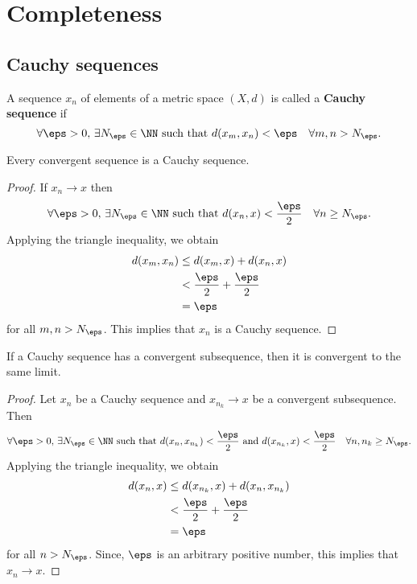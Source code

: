 \documentclass[12pt, a4paper]{article}
\begin{document}
\section{Completeness}

\subsection{Cauchy sequences}

\begin{definition}
    A sequence \(x_n\) of elements of a metric space \((X,d)\) is called a \textbf{Cauchy sequence} if 
    \[\forall \eps>0, \, \exists N_{\eps} \in \NN \text{ such that } d(x_m,x_n) <\eps \quad \forall m,n>N_{\eps}.\]
\end{definition}

\begin{lemma}
    Every convergent sequence is a Cauchy sequence.
\end{lemma}

\begin{proof}
    If \(x_n \to x\) then 
    \[\forall \eps >0, \, \exists N_{\eps} \in \NN \text{ such that } d(x_n,x)<\frac{\eps}{2} \quad \forall n\geq N_{\eps}.\]
    Applying the triangle inequality, we obtain 
    \[\begin{aligned}
        d(x_m,x_n) &\leq d(x_m,x) + d(x_n,x) \\
        &< \frac{\eps}{2} + \frac{\eps}{2} \\
        &= \eps
    \end{aligned}\]
    for all \(m,n > N_{\eps}\). This implies that \(x_n\) is a Cauchy sequence.
\end{proof} 

\begin{lemma}
    If a Cauchy sequence has a convergent subsequence, then it is convergent to the same limit.
\end{lemma}

\begin{proof}
    Let \(x_n\) be a Cauchy sequence and \(x_{n_k} \to x\) be a convergent subsequence. Then
    \[\forall \eps >0, \, \exists N_{\eps} \in \NN \text{ such that } d(x_n,x_{n_k})<\frac{\eps}{2} \text{ and } d(x_{n_k},x)< \frac{\eps}{2} \quad \forall n,n_k\geq N_{\eps}.\]
    Applying the triangle inequality, we obtain 
    \[\begin{aligned}
        d(x_n,x) &\leq d(x_{n_k},x)+d(x_n,x_{n_k}) \\
        &<\frac{\eps}{2} + \frac{\eps}{2}\\
        &= \eps
    \end{aligned}\]
    for all \(n >N_{\eps}\). Since, \(\eps\) is an arbitrary positive number, this implies that \(x_n \to x\).
\end{proof}
\end{document}
